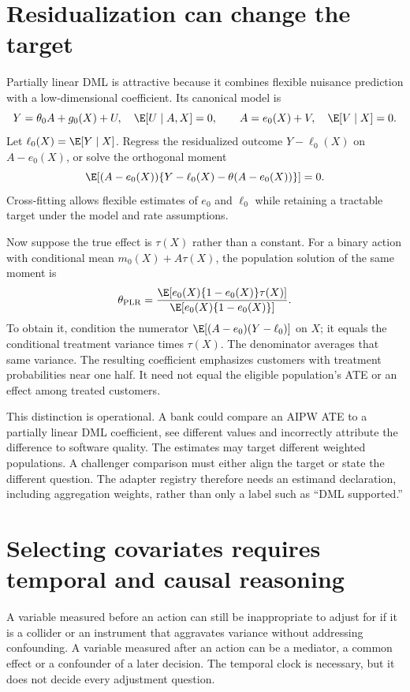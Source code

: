 \section{Residualization can change the target}
Partially linear DML is attractive because it combines flexible nuisance
prediction with a low-dimensional coefficient. Its canonical model is
\[
 Y=\theta_0 A+g_0(X)+U,\quad \E[U\mid A,X]=0,
 \qquad A=e_0(X)+V,\quad \E[V\mid X]=0.
\]
Let $\ell_0(X)=\E[Y\mid X]$. Regress the residualized outcome
$Y-\ell_0(X)$ on $A-e_0(X)$, or solve the orthogonal moment
\begin{equation}
 \E[(A-e_0(X))\{Y-\ell_0(X)-\theta(A-e_0(X))\}]=0.
 \label{eq:plr-score}
\end{equation}
Cross-fitting allows flexible estimates of $e_0$ and $\ell_0$ while
retaining a tractable target under the model and rate assumptions.

Now suppose the true effect is $\tau(X)$ rather than a constant. For a
binary action with conditional mean $m_0(X)+A\tau(X)$, the population
solution of the same moment is
\begin{equation}
 \theta_{\mathrm{PLR}}=
 \frac{\E[e_0(X)\{1-e_0(X)\}\tau(X)]}
      {\E[e_0(X)\{1-e_0(X)\}]}.
 \label{eq:plr-weighted}
\end{equation}
To obtain it, condition the numerator
$\E[(A-e_0)(Y-\ell_0)]$ on $X$; it equals the conditional
treatment variance times $\tau(X)$. The denominator averages that same
variance. The resulting coefficient emphasizes customers with treatment
probabilities near one half. It need not equal the eligible population's
ATE or an effect among treated customers.

This distinction is operational. A bank could compare an AIPW ATE to a
partially linear DML coefficient, see different values and incorrectly
attribute the difference to software quality. The estimates may target
different weighted populations. A challenger comparison must either align
the target or state the different question. The adapter registry therefore
needs an estimand declaration, including aggregation weights, rather than
only a label such as ``DML supported.''

\section{Selecting covariates requires temporal and causal reasoning}
A variable measured before an action can still be inappropriate to adjust
for if it is a collider or an instrument that aggravates variance without
addressing confounding. A variable measured after an action can be a mediator,
a common effect or a confounder of a later decision. The temporal clock is
necessary, but it does not decide every adjustment question.


